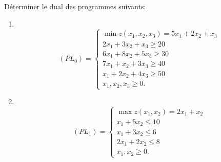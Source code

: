 \begin{td-exo} %
	Déterminer le dual des programmes suivants:
	\begin{enumerate}
		\item \, \begin{equation*}
			(PL_0) = 
			\begin{cases}
				\min z(x_1, x_2, x_3) = 5x_1 + 2x_2 + x_3\\
				2x_1 + 3x_2 + x_3 \geq 20\\
				6x_1 + 8x_2 + 5x_3 \geq 30\\
				7x_1 + x_2 + 3x_3 \geq 40\\
				x_1 + 2x_2 + 4x_3 \geq 50\\
				x_1, x_2, x_3 \geq 0.
			\end{cases}
		\end{equation*}

		\item \, \begin{equation*}
			(PL_1) = 
			\begin{cases}
				\max z(x_1, x_2) = 2x_1 + x_2\\
				x_1 + 5x_2 \leq 10\\
				x_1 + 3x_2 \leq 6\\
				2x_1 + 2x_2 \leq 8\\
				x_1, x_2 \geq 0.
			\end{cases}
		\end{equation*}
	\end{enumerate}
\end{td-exo}

